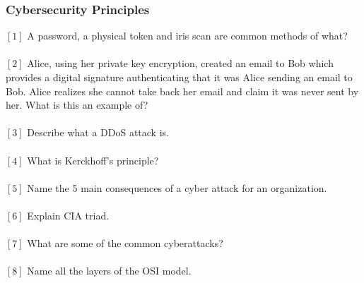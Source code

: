 \documentclass[letterpaper,12pt,addpoints]{exam}
\begin{document}
\subsubsection*{Cybersecurity Principles}
$[1]$ A password, a physical token and iris scan are common methods of what?\\
\\
$[2]$ Alice, using her private key encryption, created an email to Bob which provides a digital signature authenticating that it was Alice sending an email to Bob. Alice realizes she cannot take back her email and claim it was never sent by her. What is this an example of?\\
\\
$[3]$ Describe what a DDoS attack is. \\
\\
$[4]$ What is Kerckhoff’s principle?\\
\\
$[5]$ Name the 5 main consequences of a cyber attack for an organization.\\
\\
$[6]$ Explain CIA triad.\\
\\
$[7]$ What are some of the common cyberattacks?\\
\\
$[8]$ Name all the layers of the OSI model.
\end{document}
